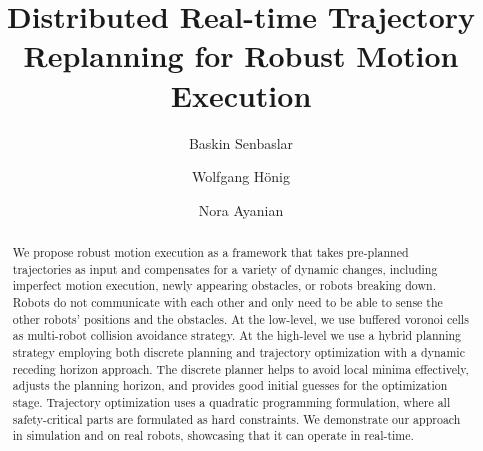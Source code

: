 \documentclass{svproc}
\begin{document}
\mainmatter              %
%
% 
\title{Distributed Real-time Trajectory Replanning for Robust Motion Execution}%


%
%
\author{Baskin Senbaslar \and Wolfgang H\"onig \and
Nora Ayanian}
%
%
%

\maketitle              %

\begin{abstract}
We propose robust motion execution as a framework that takes pre-planned trajectories as input and compensates for a variety of dynamic changes, including imperfect motion execution, newly appearing obstacles, or robots breaking down.
Robots do not communicate with each other and only need to be able to sense the other robots' positions and the obstacles.
At the low-level, we use buffered voronoi cells as multi-robot collision avoidance strategy.
At the high-level we use a hybrid planning strategy employing both discrete planning and trajectory optimization with a dynamic receding horizon approach.
The discrete planner helps to avoid local minima effectively, adjusts the planning horizon, and provides good initial guesses for the optimization stage.
Trajectory optimization uses a quadratic programming formulation, where all safety-critical parts are formulated as hard constraints.
We demonstrate our approach in simulation and on real robots, showcasing that it can operate in real-time.
\end{abstract}
\end{document}
